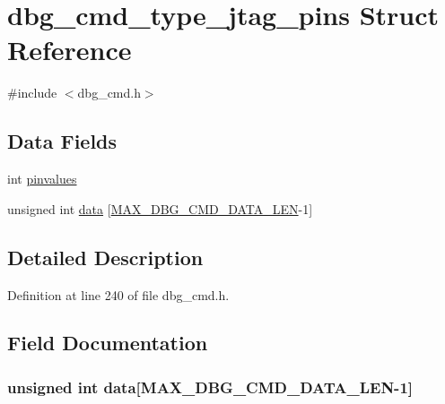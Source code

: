 \hypertarget{structdbg__cmd__type__jtag__pins}{\section{dbg\-\_\-cmd\-\_\-type\-\_\-jtag\-\_\-pins Struct Reference}
\label{structdbg__cmd__type__jtag__pins}
}


{\ttfamily \#include $<$dbg\-\_\-cmd.\-h$>$}

\subsection*{Data Fields}
\begin{DoxyCompactItemize}
\item 
int \hyperlink{structdbg__cmd__type__jtag__pins_aade21146e7e30112816c89d8f2ed8971}{pinvalues}
\item 
unsigned int \hyperlink{structdbg__cmd__type__jtag__pins_abceed6826af53b88f4cc936fac1716f0}{data} \mbox{[}\hyperlink{dbg__cmd_8h_a4552ec15033c8a68870cdf80eda5470c}{M\-A\-X\-\_\-\-D\-B\-G\-\_\-\-C\-M\-D\-\_\-\-D\-A\-T\-A\-\_\-\-L\-E\-N}-\/1\mbox{]}
\end{DoxyCompactItemize}


\subsection{Detailed Description}


Definition at line 240 of file dbg\-\_\-cmd.\-h.



\subsection{Field Documentation}
\hypertarget{structdbg__cmd__type__jtag__pins_abceed6826af53b88f4cc936fac1716f0}{
\subsubsection[{data}]{\setlength{\rightskip}{0pt plus 5cm}unsigned int data\mbox{[}{\bf M\-A\-X\-\_\-\-D\-B\-G\-\_\-\-C\-M\-D\-\_\-\-D\-A\-T\-A\-\_\-\-L\-E\-N}-\/1\mbox{]}}}\label{structdbg__cmd__type__jtag__pins_abceed6826af53b88f4cc936fac1716f0}


